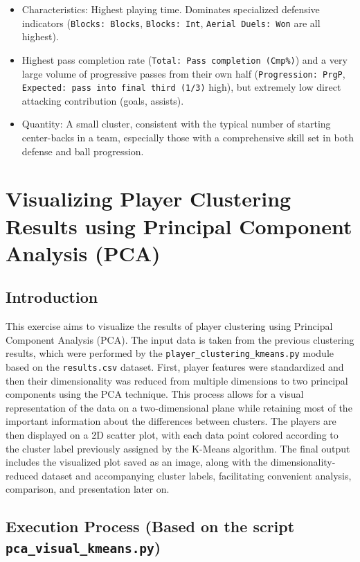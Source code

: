 \documentclass[12pt, a4paper]{report}
\begin{document}
\begin{itemize}
\begin{itemize}
        \item Characteristics: Highest playing time. Dominates specialized defensive indicators (\texttt{Blocks: Blocks}, \texttt{Blocks: Int}, \texttt{Aerial Duels: Won} are all highest).
        \item Highest pass completion rate (\texttt{Total: Pass completion (Cmp\%)}) and a very large volume of progressive passes from their own half (\texttt{Progression: PrgP}, \texttt{Expected: pass into final third (1/3)} high), but extremely low direct attacking contribution (goals, assists).
        \item Quantity: A small cluster, consistent with the typical number of starting center-backs in a team, especially those with a comprehensive skill set in both defense and ball progression.
    \end{itemize}
\end{itemize}

\section{Visualizing Player Clustering Results using Principal Component Analysis (PCA)}

\subsection{Introduction}
This exercise aims to visualize the results of player clustering using Principal Component Analysis (PCA).
The input data is taken from the previous clustering results, which were performed by the \texttt{player\_clustering\_kmeans.py} module based on the \texttt{results.csv} dataset.
First, player features were standardized and then their dimensionality was reduced from multiple dimensions to two principal components using the PCA technique.
This process allows for a visual representation of the data on a two-dimensional plane while retaining most of the important information about the differences between clusters.
The players are then displayed on a 2D scatter plot, with each data point colored according to the cluster label previously assigned by the K-Means algorithm.
The final output includes the visualized plot saved as an image, along with the dimensionality-reduced dataset and accompanying cluster labels, facilitating convenient analysis, comparison, and presentation later on.

\subsection{Execution Process \newline
(Based on the script \texttt{pca\_visual\_kmeans.py})}
\end{document}
